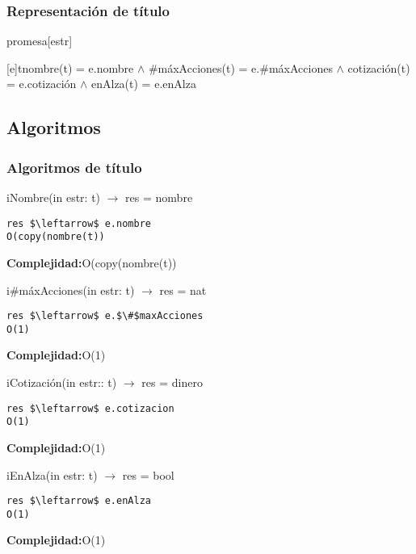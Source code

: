 \subsubsection{Representaci\'on de t\'itulo}
\begin{Estructura}{promesa}[estr]
    \begin{Tupla}[estr]
    \end{Tupla}
\end{Estructura}


[e]{t}{nombre(t) = e.nombre $\land$ $\#$m\'axAcciones(t) = e.$\#$m\'axAcciones $\land$ cotizaci\'on(t) = e.cotizaci\'on $\land$ enAlza(t) = e.enAlza}

  \subsection{Algoritmos}
\subsubsection{Algoritmos de t\'itulo}

iNombre(in estr: t) $\rightarrow$ res = nombre
\begin{lstlisting}[mathescape]
 res $\leftarrow$ e.nombre                                                        O(copy(nombre(t))
\end{lstlisting}
\textbf{Complejidad:}O(copy(nombre(t))

i$\#$m\'axAcciones(in estr: t) $\rightarrow$ res = nat
\begin{lstlisting}[mathescape]
 res $\leftarrow$ e.$\#$maxAcciones                                                   O(1)
\end{lstlisting}
\textbf{Complejidad:}O(1)


iCotizaci\'on(in estr:: t) $\rightarrow$ res = dinero
\begin{lstlisting}[mathescape]
 res $\leftarrow$ e.cotizacion                                                    O(1)
\end{lstlisting}
\textbf{Complejidad:}O(1)


iEnAlza(in estr: t) $\rightarrow$ res = bool
\begin{lstlisting}[mathescape]
 res $\leftarrow$ e.enAlza                                                        O(1)
\end{lstlisting}
\textbf{Complejidad:}O(1)


